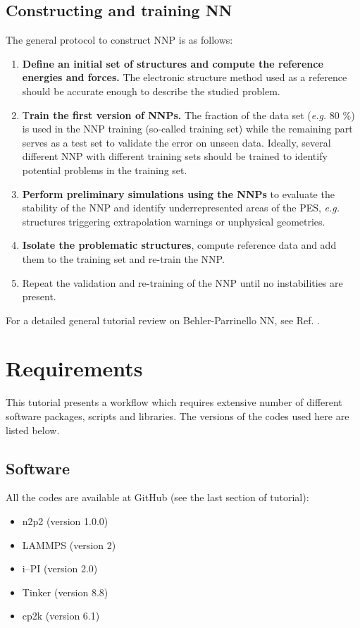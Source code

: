\documentclass[12pt]{article}
\begin{document}
\subsection{Constructing and training NN}
The general protocol to construct NNP is as follows:
\begin{enumerate}
    \item \textbf{Define an initial set of structures and compute the reference energies and forces.} The electronic structure method used as a reference should be accurate enough to describe the studied problem.
    \item T\textbf{rain the first version of NNPs.} The fraction of the data set (\textit{e.g.} 80 \%) is used in the NNP training (so-called training set) while the remaining part serves as a test set to validate the error on unseen data. Ideally, several different NNP with different training sets should be trained to identify potential problems in the training set.
    \item \textbf{Perform preliminary simulations using the NNPs} to evaluate the stability of the NNP and identify underrepresented areas of the PES, \textit{e.g.} structures triggering extrapolation warnings or unphysical geometries.
    \item \textbf{Isolate the problematic structures}, compute reference data and add them to the training set and re-train the NNP.
    \item Repeat the validation and re-training of the NNP until no instabilities are present.
\end{enumerate}

For a detailed general tutorial review on Behler-Parrinello NN, see Ref. . 

\newpage
%

\section{Requirements}
This tutorial presents a workflow which requires extensive number of different software packages, scripts and libraries. The versions of the codes used here are listed below.

\subsection{Software}
All the codes are available at GitHub (see the last section of tutorial):
\begin{itemize}
    \item n2p2 (version 1.0.0)
    \item LAMMPS (version 2)
    \item i--PI (version 2.0)
    \item Tinker (version 8.8)
    \item cp2k (version 6.1)
\end{itemize}
%
\end{document}
